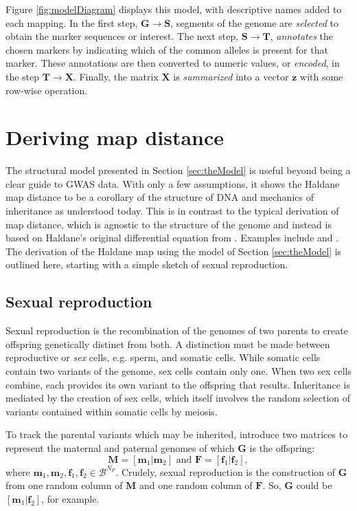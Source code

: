 \documentclass[12pt]{article}
\newcommand{\ve}[1]{\mathbf{#1}}           %
\newcommand{\m}[1]{\mathbf{#1}}               %
\begin{document}
Figure \ref{fig:modelDiagram} displays this model, with descriptive names added to each mapping. In the first step, $\m{G} \rightarrow \m{S}$, segments of the genome are \textit{selected} to obtain the marker sequences or interest. The next step, $\m{S} \rightarrow \m{T}$, \textit{annotates} the chosen markers by indicating which of the common alleles is present for that marker. These annotations are then converted to numeric values, or \textit{encoded}, in the step $\m{T} \rightarrow \m{X}$. Finally, the matrix $\m{X}$ is \textit{summarized} into a vector $\ve{z}$ with some row-wise operation.

\section{Deriving map distance} \label{sec:derivingDists}

The structural model presented in Section \ref{sec:theModel} is useful beyond being a clear guide to GWAS data. With only a few assumptions, it shows the Haldane map distance to be a corollary of the structure of DNA and mechanics of inheritance as understood today. This is in contrast to the typical derivation of map distance, which is agnostic to the structure of the genome and instead is based on Haldane's original differential equation from \cite{haldane1919}. Examples include \cite{kosambi1943estimation} and \cite{xu2013principles}. The derivation of the Haldane map using the model of Section \ref{sec:theModel} is outlined here, starting with a simple sketch of sexual reproduction.

\subsection{Sexual reproduction} \label{subsec:crossingover}

Sexual reproduction is the recombination of the genomes of two parents to create offspring genetically distinct from both. A distinction must be made between reproductive or \emph{sex} cells, e.g. sperm, and somatic cells. While somatic cells contain two variants of the genome, sex cells contain only one. When two sex cells combine, each provides its own variant to the offspring that results. Inheritance is mediated by the creation of sex cells, which itself involves the random selection of variants contained within somatic cells by meiosis.

To track the parental variants which may be inherited, introduce two matrices to represent the maternal and paternal genomes of which $\m{G}$ is the offspring:
$$\m{M} = [\ve{m}_1| \ve{m}_2] \text{ and } \m{F} = [\ve{f}_1| \ve{f}_2],$$
where $\ve{m}_1, \ve{m}_2, \ve{f}_1, \ve{f}_2 \in \mathcal{B}^{N_P}$. Crudely, sexual reproduction is the construction of $\m{G}$ from one random column of $\m{M}$ and one random column of $\m{F}$. So, $\m{G}$ could be $[\ve{m}_1 | \ve{f}_2]$, for example.
\end{document}
